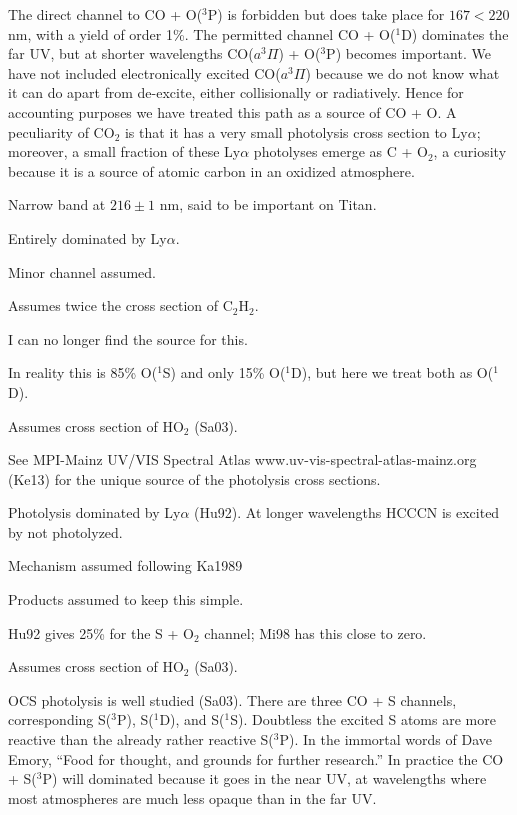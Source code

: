 \documentclass[12pt,landscape]{article}
\newcounter{photo}
\begin{document}
 The direct channel to CO + O($^3$P) is forbidden but does take place for $167\!<\!220$ nm, with a yield of order 1\%.
The permitted channel CO + O($^1$D) dominates the far UV, but at shorter wavelengths
 CO($a^3\Pi$) + O($^3$P) becomes important.  We have not included electronically excited CO($a^3\Pi$) because we do not know
 what it can do apart from de-excite, either collisionally or radiatively.  Hence for accounting purposes we have treated this path as a source of CO + O.
A peculiarity of CO$_2$ is that it has a very small photolysis cross section to Ly$\alpha$; moreover, a small fraction of
these Ly$\alpha$ photolyses emerge as C + O$_2$, a curiosity because it is a source of atomic carbon in an oxidized atmosphere.

 Narrow band at $216\pm 1$ nm, said to be important on Titan.

 Entirely dominated by Ly$\alpha$.

 Minor channel assumed.

  Assumes twice the cross section of C$_2$H$_2$.

 I can no longer find the source for this.

 In reality this is 85\% O($^1$S) and only 15\% O($^1$D), but here we treat both as O($^1$D).

 Assumes cross section of HO$_2$ (Sa03).

 See MPI-Mainz UV/VIS Spectral Atlas www.uv-vis-spectral-atlas-mainz.org (Ke13)  for the unique source of the photolysis cross sections.

 Photolysis dominated by Ly$\alpha$ (Hu92).  At longer wavelengths HCCCN is excited by not photolyzed.

 Mechanism assumed following Ka1989

 Products assumed to keep this simple.

 Hu92 gives 25\% for the S + O$_2$ channel; Mi98 has this close to zero.

 Assumes cross section of HO$_2$ (Sa03).

 OCS photolysis is well studied (Sa03).
There are three CO + S channels, corresponding S($^3$P), S($^1$D), and S($^1$S). 
Doubtless the excited S atoms are more reactive than the already rather reactive S($^3$P).
In the immortal words of Dave Emory, ``Food for thought, and grounds for further research.''
In practice the CO + S($^3$P) will dominated because it goes in the near UV, at wavelengths where most
atmospheres are much less opaque than in the far UV.
\end{document}
